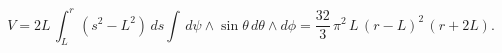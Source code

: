 \begin{equation}
V=2L\,\int_{L}^{r}(s^2-L^2)\,ds \int\, d\psi \wedge \sin\theta\,
d\theta \wedge d\phi= \frac{32}{3}\,\pi^2\,L\,(r-L)^2\,(r+2L).
\end{equation}

